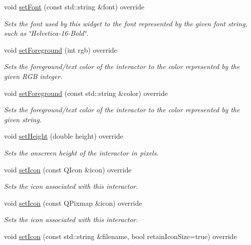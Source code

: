 \begin{DoxyCompactItemize}
void \mbox{\hyperlink{classsgl_1_1GLabel_a51367c9fd2709973b1f7238734f93891}{set\+Font}} (const std\+::string \&font) override
\begin{DoxyCompactList}\small\item\em Sets the font used by this widget to the font represented by the given font string, such as \char`\"{}\+Helvetica-\/16-\/\+Bold\char`\"{}. \end{DoxyCompactList}\item 
void \mbox{\hyperlink{classsgl_1_1GLabel_a59f7cd2bd1708c12dfa52a8f7c7b79c9}{set\+Foreground}} (int rgb) override
\begin{DoxyCompactList}\small\item\em Sets the foreground/text color of the interactor to the color represented by the given R\+GB integer. \end{DoxyCompactList}\item 
void \mbox{\hyperlink{classsgl_1_1GLabel_a8afbcf1f47750fb4c717f9ff36540235}{set\+Foreground}} (const std\+::string \&color) override
\begin{DoxyCompactList}\small\item\em Sets the foreground/text color of the interactor to the color represented by the given string. \end{DoxyCompactList}\item 
void \mbox{\hyperlink{classsgl_1_1GLabel_a5eead864d1249c4406f32f9944ed1503}{set\+Height}} (double height) override
\begin{DoxyCompactList}\small\item\em Sets the onscreen height of the interactor in pixels. \end{DoxyCompactList}\item 
void \mbox{\hyperlink{classsgl_1_1GLabel_acca97b6c6330abded1c80521c9aca3a6}{set\+Icon}} (const Q\+Icon \&icon) override
\begin{DoxyCompactList}\small\item\em Sets the icon associated with this interactor. \end{DoxyCompactList}\item 
void \mbox{\hyperlink{classsgl_1_1GLabel_acb5275b880ff622d306f8f33428b4e34}{set\+Icon}} (const Q\+Pixmap \&icon) override
\begin{DoxyCompactList}\small\item\em Sets the icon associated with this interactor. \end{DoxyCompactList}\item 
void \mbox{\hyperlink{classsgl_1_1GLabel_abbefcb1f611af273755c7e1cca921497}{set\+Icon}} (const std\+::string \&filename, bool retain\+Icon\+Size=true) override

\end{DoxyCompactItemize}
